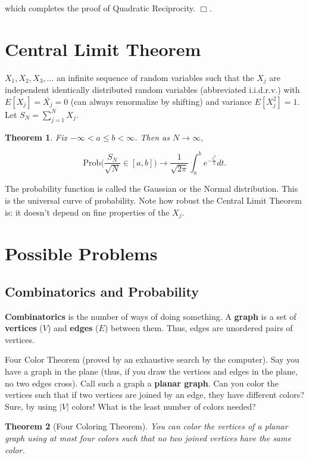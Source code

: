 \documentclass[12pt,letterpaper]{report}
\newcommand\be{\begin{equation}}
\newcommand\ee{\end{equation}}
\newtheorem{thm}{Theorem}[section]
\begin{document}
which completes the proof of Quadratic Reciprocity. $\Box$.






\section{Central Limit Theorem}
$X_1, X_2, X_3, \dots $ an infinite sequence of random variables
such that the $X_j$ are independent identically distributed random
variables (abbreviated i.i.d.r.v.) with $E[X_j] = \bar{X_j} = 0$
(can always renormalize by shifting) and variance $E[X_j^2] = 1$.
Let $S_N = \sum_{j=1}^N X_j$.

\begin{thm} Fix $-\infty < a \le b < \infty$. Then as $N
\rightarrow \infty$,

\be \mbox{Prob}\Big( \frac{S_N}{\sqrt{N}} \in [a,b] \Big)
\rightarrow \frac{1}{\sqrt{2\pi}} \int_a^b e^{-\frac{t^2}{2}} dt.
\ee
\end{thm}

The probability function is called the Gaussian or the Normal
distribution. This is the universal curve of probability. Note how
robust the Central Limit Theorem is: it doesn't depend on fine
properties of the $X_j$.

\section{Possible Problems}

\subsection{Combinatorics and Probability}

\textbf{Combinatorics} is the number of ways of doing something. A
\textbf{graph} is a set of \textbf{vertices} ($V$) and
\textbf{edges} ($E$) between them. Thus, edges are unordered pairs
of vertices.

Four Color Theorem (proved by an exhaustive search by the
computer). Say you have a graph in the plane (thus, if you draw
the vertices and edges in the plane, no two edges cross). Call
such a graph a \textbf{planar graph}. Can you color the vertices
such that if two vertices are joined by an edge, they have
different colors? Sure, by using $|V|$ colors! What is the least
number of colors needed?

\begin{thm}[Four Coloring Theorem] You can color the vertices of a
planar graph using at most four colors such that no two joined
vertices have the same color. \end{thm}
\end{document}
